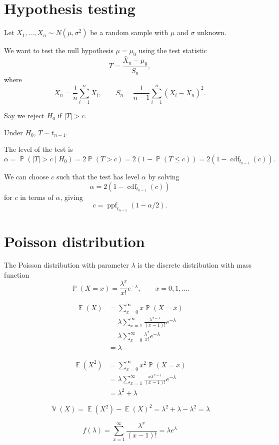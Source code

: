 \documentclass{amsart}
\DeclareMathOperator{\Exp}{\mathbb{E}}
\DeclareMathOperator{\Var}{\mathbb{V}}
\DeclareMathOperator{\Prob}{\mathbb{P}}
\DeclareMathOperator{\CDF}{cdf}
\DeclareMathOperator{\PPF}{ppf}
\begin{document}
\section{Hypothesis testing}

Let $X_1,\ldots,X_n\sim N(\mu, \sigma^2)$ be a random sample with $\mu$ and $\sigma$ unknown.

We want to test the null hypothesis $\mu=\mu_0$ using the test statistic
$$
T = \frac{\bar{X}_n - \mu_0}{S_n},
$$
where
$$
\bar{X}_n = \frac1n\sum_{i=1}^n X_i,\qquad
S_n = \frac1{n - 1}\sum_{i=1}^n (X_i - \bar{X}_n)^2.
$$

Say we reject $H_0$ if $|T| > c$.

Under $H_0$, $T\sim t_{n-1}$.

The level of the test is
$$
\alpha = \Prob(|T| > c\mid H_0) = 2\Prob(T > c) = 2(1 - \Prob(T \leq c)) = 2(1 - \CDF_{t_{n-1}}(c)).
$$

We can choose $c$ such that the test has level $\alpha$ by solving
$$
\alpha = 2(1 - \CDF_{t_{n-1}}(c))
$$
for $c$ in terms of $\alpha$, giving
$$
c = \PPF_{t_{n-1}}(1 - \alpha/2).
$$

\section{Poisson distribution}

The Poisson distribution with parameter $\lambda$ is the discrete distribution with mass function
$$
\Prob(X=x) = \frac{\lambda^x}{x!}e^{-\lambda},\qquad x=0,1,\ldots.
$$

\begin{align*}
\Exp(X) &= \sum_{x=0}^\infty x\Prob(X=x)\\
&= \lambda\sum_{x=1}^\infty\frac{\lambda^{x - 1}}{(x - 1)!} e^{-\lambda}\\
&= \lambda \sum_{x=0}^\infty \frac{\lambda^x}{x!}e^{-\lambda}\\
&= \lambda
\end{align*}

\begin{align*}
\Exp(X^2) &= \sum_{x=0}^\infty x^2\Prob(X=x)\\
&= \lambda\sum_{x=1}^\infty \frac{x\lambda^{x - 1}}{(x - 1)!}e^{-\lambda}\\
&= \lambda^2 + \lambda
\end{align*}

$$
\Var(X) = \Exp(X^2) - \Exp(X)^2 = \lambda^2 + \lambda - \lambda^2 = \lambda
$$

$$
f(\lambda) = \sum_{x=1}^\infty\frac{\lambda^x}{(x - 1)!} = \lambda e^\lambda
$$
\end{document}
